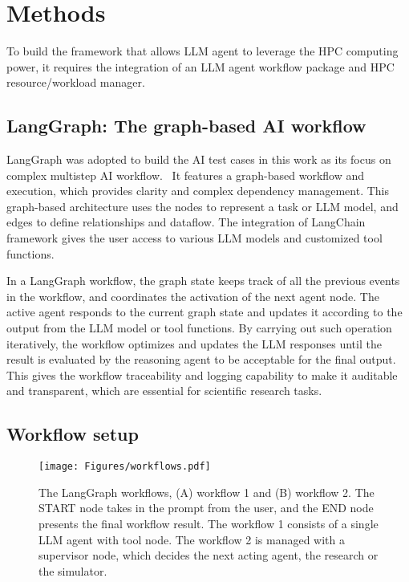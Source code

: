 \section{Methods}
To build the framework that allows LLM agent to leverage the HPC computing power, it requires the integration of an LLM agent workflow package and HPC resource/workload manager. 


\subsection{LangGraph: The graph-based AI workflow}
LangGraph was adopted to build the AI test cases in this work as its focus on complex multistep AI workflow.~\cite{langgraph}
It features a graph-based workflow and execution, which provides clarity and complex dependency management. 
This graph-based architecture uses the nodes to represent a task or LLM model, and edges to define relationships and dataflow. 
The integration of LangChain framework gives the user access to various LLM models and customized tool functions.~\cite{langchain}


In a LangGraph workflow, the graph state keeps track of all the previous events in the workflow, and coordinates the activation of the next agent node.
The active agent responds to the current graph state and updates it according to the output from the LLM model or tool functions. 
By carrying out such operation iteratively, the workflow optimizes and updates the LLM responses until the result is evaluated by the reasoning agent to be acceptable for the final output. 
This gives the workflow traceability and logging capability to make it auditable and transparent, which are essential for scientific research tasks. 


\subsection{Workflow setup}
\label{sec:wf_setup}

\begin{figure*}
    \centering
    \texttt{[image: Figures/workflows.pdf]}
    \caption{The LangGraph workflows, (A) workflow 1 and (B) workflow 2. The START node takes in the prompt from the user, and the END node presents the final workflow result. The workflow 1 consists of a single LLM agent with tool node. The workflow 2 is managed with a supervisor node, which decides the next acting agent, the research or the simulator. }
    \Description{}
    \label{fig:wfs}
\end{figure*}


